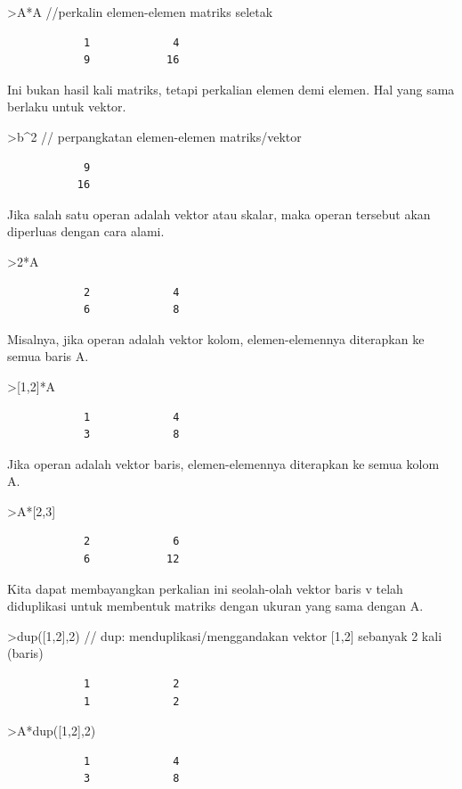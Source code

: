 \documentclass[
]{book}
\begin{document}
\textgreater A*A //perkalin elemen-elemen matriks seletak

\begin{verbatim}
            1             4 
            9            16 
\end{verbatim}

Ini bukan hasil kali matriks, tetapi perkalian elemen demi elemen. Hal yang sama berlaku untuk vektor.

\textgreater b\^{}2 // perpangkatan elemen-elemen matriks/vektor

\begin{verbatim}
            9 
           16 
\end{verbatim}

Jika salah satu operan adalah vektor atau skalar, maka operan tersebut akan diperluas dengan cara alami.

\textgreater2*A

\begin{verbatim}
            2             4 
            6             8 
\end{verbatim}

Misalnya, jika operan adalah vektor kolom, elemen-elemennya diterapkan ke semua baris A.

\textgreater{[}1,2{]}*A

\begin{verbatim}
            1             4 
            3             8 
\end{verbatim}

Jika operan adalah vektor baris, elemen-elemennya diterapkan ke semua kolom A.

\textgreater A*{[}2,3{]}

\begin{verbatim}
            2             6 
            6            12 
\end{verbatim}

Kita dapat membayangkan perkalian ini seolah-olah vektor baris v telah diduplikasi untuk membentuk matriks dengan ukuran yang sama dengan A.

\textgreater dup({[}1,2{]},2) // dup: menduplikasi/menggandakan vektor {[}1,2{]} sebanyak 2 kali (baris)

\begin{verbatim}
            1             2 
            1             2 
\end{verbatim}

\textgreater A*dup({[}1,2{]},2)

\begin{verbatim}
            1             4 
            3             8 
\end{verbatim}
\end{document}
